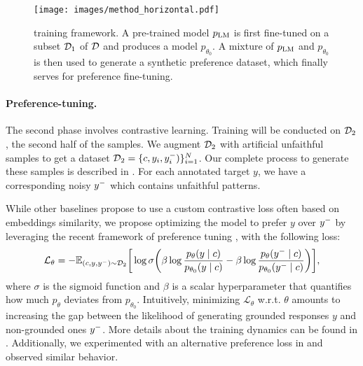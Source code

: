 \begin{figure}[t]
     \centering
     \texttt{[image: images/method\_horizontal.pdf]}
     \caption{\scope training framework. A pre-trained model $p_{\text{LM}}$ is first fine-tuned on a subset $\mathcal{D}_1$ of $\mathcal{D}$  and produces a model $p_{\theta_0}$. A mixture of $p_{\text{LM}}$ and $p_{\theta_0}$ is then used to generate a synthetic preference dataset, which finally serves for preference fine-tuning.}
     \label{fig:method}
\end{figure}

\paragraph{Preference-tuning.} The second phase involves contrastive learning. Training will be conducted on $\mathcal{D}_2$, the second half of the samples.
We augment $\mathcal{D}_2$ with artificial unfaithful samples to get a dataset $\mathcal{D}_2 = \{c, y_i, y_i^-)\}_{i=1}^N$. Our complete process to generate these samples is described in . For each annotated target $y$, we have a corresponding noisy $y^-$ which contains unfaithful patterns.

While other baselines propose to use a custom contrastive loss often based on embeddings similarity, we propose optimizing the model to prefer $y$ over $y^-$ by leveraging the recent framework of preference tuning \citep{dpo}, with the following loss:
\begin{equation}
    \mathcal{L}_\theta = -\mathbb{E}_{(c, y, y^-) \sim \mathcal{D}_2} \bigg[\log \sigma\bigg(\beta \log \frac{p_\theta(y \mid c)}{p_{\theta_0}(y \mid c)}
    -\beta \log \frac{p_\theta(y^- \mid c)}{p_{\theta_0}(y^- \mid c)}\bigg)\bigg],
    \label{eq:dpo}
\end{equation}
where $\sigma$ is the sigmoid function and $\beta$ is a scalar hyperparameter that quantifies how much $p_\theta$ deviates from $p_{\theta_0}$. 
Intuitively, minimizing $\mathcal{L}_\theta$ w.r.t. $\theta$ amounts to increasing the gap between the likelihood of generating grounded responses $y$ and non-grounded ones $y^-$. More details about the training dynamics can be found in . Additionally, we experimented with an alternative preference loss in  and observed similar behavior.

